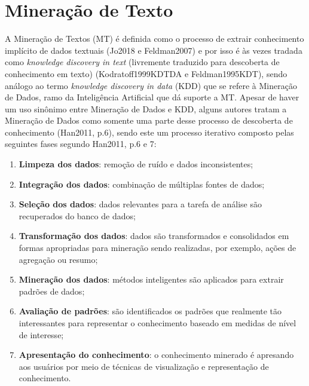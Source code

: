 \section{Mineração de Texto} \label{sec:MineraçãoTexto}
A Mineração de Textos (MT) é definida como o processo de extrair conhecimento implícito de dados textuais (Jo2018 e Feldman2007) e por isso é às vezes tradada como \textit{knowledge discovery in text} (livremente traduzido para descoberta de conhecimento em texto) (Kodratoff1999KDTDA e Feldman1995KDT), sendo análogo ao termo \textit{knowledge discovery in data} (KDD) que se refere à Mineração de Dados, ramo da Inteligência Artificial que dá suporte a MT. 
Apesar de haver um uso sinônimo entre Mineração de Dados e KDD, alguns autores tratam a Mineração de Dados como somente uma parte desse processo de descoberta de conhecimento (Han2011, p.6), sendo este um processo iterativo composto pelas seguintes fases segundo Han2011, p.6 e 7:
\begin{enumerate}
    \item \textbf{Limpeza dos dados}: remoção de ruído e dados inconsistentes;
    \item \textbf{Integração dos dados}: combinação de múltiplas fontes de dados;
    \item \textbf{Seleção dos dados}: dados relevantes para a tarefa de análise são recuperados do banco de dados;
    \item \textbf{Transformação dos dados}: dados são transformados e consolidados em formas apropriadas para mineração sendo realizadas, por exemplo, ações de agregação ou resumo;
    \item \textbf{Mineração dos dados}: métodos inteligentes são aplicados para extrair padrões de dados;
    \item \textbf{Avaliação de padrões}: são identificados os padrões que realmente tão interessantes para representar o conhecimento baseado em medidas de nível de interesse;
    \item \textbf{Apresentação do conhecimento}: o conhecimento minerado é apresando aos usuários por meio de técnicas de visualização e representação de conhecimento.
\end{enumerate}

